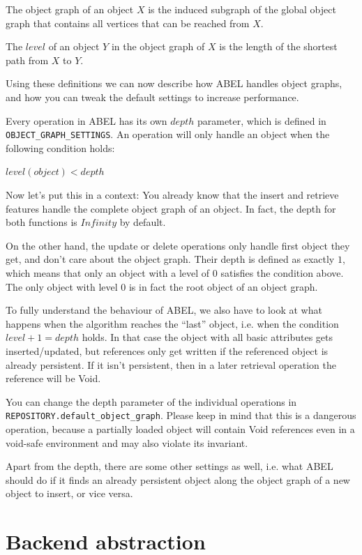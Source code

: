 The object graph of an object $X$ is the induced subgraph of the global object graph that contains all vertices that can be reached from $X$.

The $level$ of an object $Y$ in the object graph of $X$ is the length of the shortest path from $X$ to $Y$.

Using these definitions we can now describe how ABEL handles object graphs, and how you can tweak the default settings to increase performance.

Every operation in ABEL has its own $depth$ parameter, which is defined in \lstinline!OBJECT_GRAPH_SETTINGS!.
An operation will only handle an object when the following condition holds:

\begin{center}
 $ level(object) < depth $ 
\end{center}

Now let's put this in a context:
You already know that the insert and retrieve features handle the complete object graph of an object. 
In fact, the depth for both functions is $Infinity$ by default.

On the other hand, the update or delete operations only handle first object they get, and don't care about the object graph.
Their depth is defined as exactly $1$, which means that only an object with a level of $0$ satisfies the condition above.
The only object with level $0$ is in fact the root object of an object graph.

To fully understand the behaviour of ABEL, we also have to look at what happens when the algorithm reaches the ``last'' object, i.e. when the condition $level + 1 = depth$ holds.
In that case the object with all basic attributes gets inserted/updated, but references only get written if the referenced object is already persistent.
If it isn't persistent, then in a later retrieval operation the reference will be Void.

You can change the depth parameter of the individual operations in \lstinline!REPOSITORY.default_object_graph!. 
Please keep in mind that this is a dangerous operation, because a partially loaded object will contain Void references even in a void-safe environment and may also violate its invariant.

Apart from the depth, there are some other settings as well, i.e. what ABEL should do if it finds an already persistent object along the object graph of a new object to insert, or vice versa.

\section{Backend abstraction}

